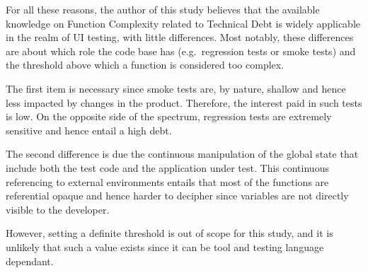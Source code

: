     For all these reasons, the author of this study believes that the available knowledge on Function Complexity related to Technical Debt is widely applicable in the realm of UI testing, with little differences. Most notably, these differences are about which role the code base has (e.g.\ regression tests or smoke tests) and the threshold above which a function is considered too complex. 
    
    The first item is necessary since smoke tests are, by nature, shallow and hence less impacted by changes in the product. Therefore, the interest paid in such tests is low. On the opposite side of the spectrum, regression tests are extremely sensitive and hence entail a high debt. 
    
    The second difference is due the continuous manipulation of the global state that include both the test code and the application under test. This continuous referencing to external environments entails that most of the functions are referential opaque \cite{referential_transparency} and hence harder to decipher since variables are not directly visible to the developer.
    
    However, setting a definite threshold is out of scope for this study, and it is unlikely that such a value exists since it can be tool and testing language dependant.
        
    	
